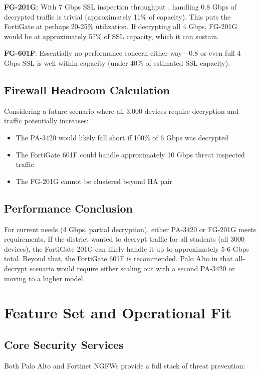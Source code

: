 \documentclass[12pt]{article}
\begin{document}
\textbf{FG-201G}: With 7 Gbps SSL inspection throughput \cite{fortigate201g}, handling 0.8 Gbps of decrypted traffic is trivial (approximately 11\% of capacity). This puts the FortiGate at perhaps 20-25\% utilization. If decrypting all 4 Gbps, FG-201G would be at approximately 57\% of SSL capacity, which it can sustain.

\textbf{FG-601F}: Essentially no performance concern either way—0.8 or even full 4 Gbps SSL is well within capacity (under 40\% of estimated SSL capacity).

\subsection{Firewall Headroom Calculation}

Considering a future scenario where all 3,000 devices require decryption and traffic potentially increases:
\begin{itemize}
    \item The PA-3420 would likely fall short if 100\% of 6 Gbps was decrypted
    \item The FortiGate 601F could handle approximately 10 Gbps threat inspected traffic
    \item The FG-201G cannot be clustered beyond HA pair
\end{itemize}

\subsection{Performance Conclusion}

For current needs (4 Gbps, partial decryption), either PA-3420 or FG-201G meets requirements. If the district wanted to decrypt traffic for all students (all 3000 devices), the FortiGate 201G can likely handle it up to approximately 5-6 Gbps total. Beyond that, the FortiGate 601F is recommended. Palo Alto in that all-decrypt scenario would require either scaling out with a second PA-3420 or moving to a higher model.

\section{Feature Set and Operational Fit}

\subsection{Core Security Services}

Both Palo Alto and Fortinet NGFWs provide a full stack of threat prevention:
\end{document}
